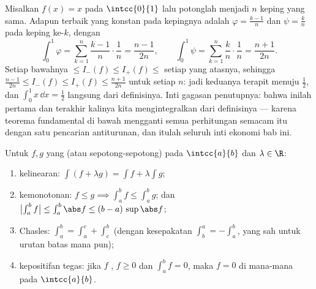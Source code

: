 \begin{example}\label{ex:b1:integration:defcompute}
Misalkan $f(x) = x$ pada $\intcc{0}{1}$ lalu potonglah menjadi $n$ keping yang sama.
Adapun  terbaik yang konstan pada kepingnya adalah $\varphi =
\frac{k-1}{n}$ dan $\psi = \frac kn$ pada keping ke-$k$, dengan
\[
\int_0^1 \varphi = \sum_{k=1}^{n} \frac{k-1}{n}\cdot\frac1n
= \frac{n-1}{2n},
\qquad
\int_0^1 \psi = \sum_{k=1}^{n} \frac{k}{n}\cdot\frac1n
= \frac{n+1}{2n} .
\]
Setiap  bawahnya $\leq I_-(f) \leq I_+(f) \leq$ setiap
yang atasnya, sehingga $\frac{n-1}{2n} \leq I_-(f) \leq I_+(f) \leq
\frac{n+1}{2n}$ untuk setiap $n$: jadi keduanya terapit menuju $\frac12$, dan
$\int_0^1 x\,\dd x = \frac12$ langsung dari definisinya. Inti
gagasan penutupnya: bahwa inilah pertama dan terakhir kalinya kita mengintegralkan
dari definisinya --- karena teorema fundamental di bawah mengganti
semua perhitungan semacam itu dengan satu pencarian antiturunan, dan itulah
seluruh inti ekonomi bab ini.
\end{example}

\begin{theorem}[Sifatnya]\label{thm:b1:integration:props}
Untuk $f, g$ yang  (atau  sepotong-sepotong) pada $\intcc{a}{b}$ dan
$\lambda \in \R$:
\begin{enumerate}
  \item kelinearan: $\int (f + \lambda g) = \int f + \lambda \int g$;
  \item kemonotonan: $f \leq g \implies \int_a^b f \leq \int_a^b g$;
        dan $\bigl|\int_a^b f\bigr| \leq \int_a^b \abs f \leq (b -
        a)\, \sup\abs f$;
  \item Chasles: $\int_a^b = \int_a^c + \int_c^b$ (dengan
        kesepakatan $\int_b^a = -\int_a^b$, yang sah untuk urutan
        batas mana pun);
  \item kepositifan tegas: jika $f$ , $f \geq 0$ dan
        $\int_a^b f = 0$, maka $f = 0$ di mana-mana pada
        $\intcc{a}{b}$.
\end{enumerate}
\end{theorem}

